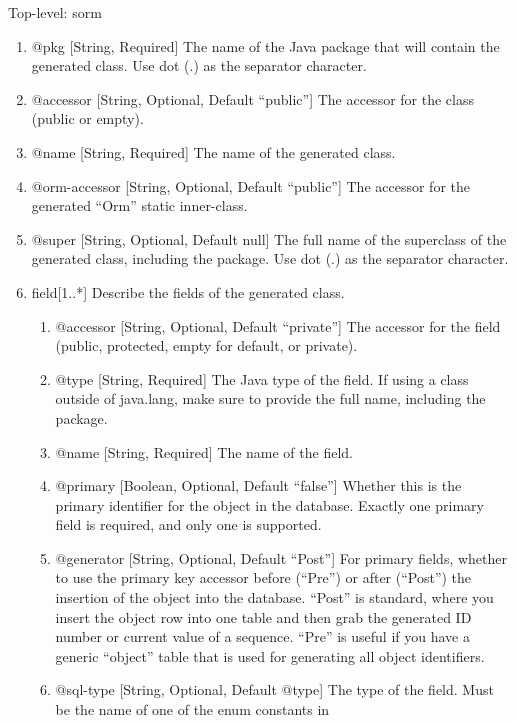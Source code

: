 \documentclass{book}
\begin{document}
Top-level: sorm
\begin{enumerate}
    \item @pkg [String, Required] The name of the Java package that will contain
          the generated class. Use dot (.) as the separator character.
    \item @accessor [String, Optional, Default ``public''] The accessor for the
          class (public or empty).
    \item @name [String, Required] The name of the generated class.
    \item @orm-accessor [String, Optional, Default ``public''] The accessor for
          the generated ``Orm'' static inner-class.
    \item @super [String, Optional, Default null] The full name of the
          superclass of the generated class, including the package. Use dot (.)
          as the separator character.
    \item field[1..*] Describe the fields of the generated class.
    \begin{enumerate}
        \item @accessor [String, Optional, Default ``private''] The accessor for
              the field (public, protected, empty for default, or private).
        \item @type [String, Required] The Java type of the field. If using a
              class outside of java.lang, make sure to provide the full name,
              including the package.
        \item @name [String, Required] The name of the field.
        \item @primary [Boolean, Optional, Default ``false''] Whether this is
              the primary identifier for the object in the database. Exactly one
              primary field is required, and only one is supported.
        \item @generator [String, Optional, Default ``Post''] For primary
              fields, whether to use the primary key accessor before (``Pre'')
              or after (``Post'') the insertion of the object into the database.
              ``Post'' is standard, where you insert the object row into one
              table and then grab the generated ID number or current value of a
              sequence. ``Pre'' is useful if you have a generic ``object'' table
              that is used for generating all object identifiers.
        \item @sql-type [String, Optional, Default @type] The type of the field.
              Must be the name of one of the enum constants in\\

\end{enumerate}
\end{enumerate}
\end{document}
